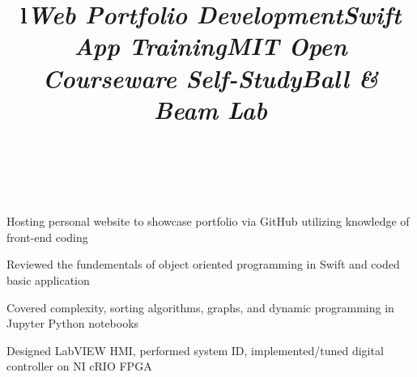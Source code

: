 \documentclass[mm]{res}
\begin{document}
\begin{resume}
\toprule
\section{\headingprojects}
\begin{format}
\title{l}\\
\body\\
\end{format}


\title{\textsl{Web Portfolio Development}}
\begin{position}
\tb Hosting personal website to showcase portfolio via GitHub utilizing knowledge of front-end coding
\end{position}

\title{\textsl{Swift App Training}}
\begin{position}
\tb Reviewed the fundementals of object oriented programming in Swift and coded basic application
\end{position}


\title{\textsl{MIT Open Courseware Self-Study}}
\begin{position}
\tb Covered complexity, sorting algorithms, graphs, and dynamic programming in Jupyter Python notebooks
\end{position}


\title{\textsl{Ball \& Beam Lab}}
\begin{position}
\tb Designed LabVIEW HMI, performed system ID, implemented/tuned digital controller on NI cRIO FPGA
\end{position}


\end{resume}
\end{document}

